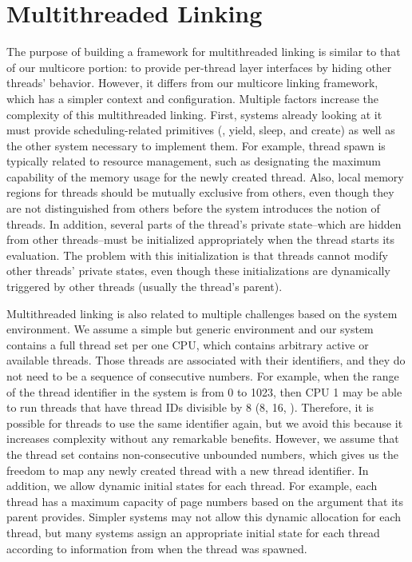 \section{Multithreaded Linking}
\label{chapter:linking:sec:multithreaded-linking}

The purpose of building a framework for multithreaded linking is similar to that of our multicore portion: 
to provide per-thread layer interfaces by hiding other threads’ behavior. 
However, it differs from our multicore linking framework, which has a simpler context and configuration. 
Multiple factors increase the complexity of this multithreaded linking. 
First, systems already looking at it must provide scheduling-related primitives (\ie, yield, sleep, and create) as well as the other system necessary to implement them. 
For example, thread spawn is typically related to resource management, such as designating the maximum capability of the memory usage for the newly created thread. 
Also, local memory regions for threads should be mutually exclusive from 
others, even though they are not distinguished from others before the system introduces the notion of threads. 
In addition, several parts of the thread’s private state--which are hidden from other threads--must be initialized appropriately when the thread starts its evaluation. 
The problem with this initialization is that threads cannot modify other threads’ private states, even though these initializations are dynamically triggered by other threads (usually the thread’s parent).

Multithreaded linking is also related to multiple challenges based on the system environment. 
We assume a simple but generic environment and our system contains a full thread set per one CPU, 
which contains arbitrary active or available threads. 
Those threads are associated with their identifiers, and they do not need to be a sequence of consecutive numbers. 
For example, when the range of the thread identifier in the system is from 0 to 1023, then CPU 1 may be able to run threads that have thread IDs divisible by 8 (8, 16, \etc). 
Therefore, it is possible for threads to use the same identifier again, but we avoid this because it increases complexity without any remarkable benefits. 
However, we assume that the thread set contains non-consecutive unbounded numbers, which gives us the freedom to map any newly created thread with a new thread identifier. 
In addition, we allow dynamic initial states for each thread. 
For example, each thread has a maximum capacity of page numbers based on the argument that its parent provides. 
Simpler systems may not allow this dynamic allocation for each thread, but many systems assign an appropriate initial state for each thread according to information from when the thread was spawned.


